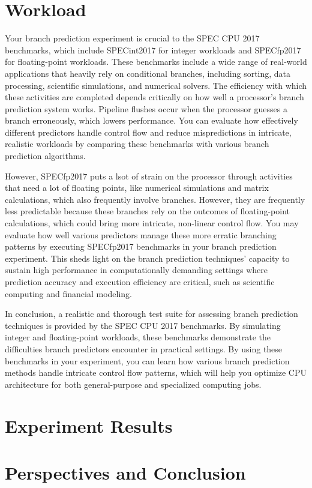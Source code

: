 \documentclass[10pt,journal,compsoc]{IEEEtran}
\begin{document}
\section{Workload}\label{workload}
\noindent Your branch prediction experiment is crucial to the SPEC CPU 2017 benchmarks, which include SPECint2017 for integer workloads and SPECfp2017 for floating-point workloads. These benchmarks include a wide range of real-world applications that heavily rely on conditional branches, including sorting, data processing, scientific simulations, and numerical solvers. The efficiency with which these activities are completed depends critically on how well a processor's branch prediction system works. Pipeline flushes occur when the processor guesses a branch erroneously, which lowers performance. You can evaluate how effectively different predictors handle control flow and reduce mispredictions in intricate, realistic workloads by comparing these benchmarks with various branch prediction algorithms.

However, SPECfp2017 puts a lsot of strain on the processor through activities that need a lot of floating points, like numerical simulations and matrix calculations, which also frequently involve branches. However, they are frequently less predictable because these branches rely on the outcomes of floating-point calculations, which could bring more intricate, non-linear control flow. You may evaluate how well various predictors manage these more erratic branching patterns by executing SPECfp2017 benchmarks in your branch prediction experiment. This sheds light on the branch prediction techniques' capacity to sustain high performance in computationally demanding settings where prediction accuracy and execution efficiency are critical, such as scientific computing and financial modeling.

In conclusion, a realistic and thorough test suite for assessing branch prediction techniques is provided by the SPEC CPU 2017 benchmarks. By simulating integer and floating-point workloads, these benchmarks demonstrate the difficulties branch predictors encounter in practical settings. By using these benchmarks in your experiment, you can learn how various branch prediction methods handle intricate control flow patterns, which will help you optimize CPU architecture for both general-purpose and specialized computing jobs.
\section{Experiment Results}\label{results}

\section{Perspectives and Conclusion}\label{conclusion}

\nocite*{}


\end{document}
